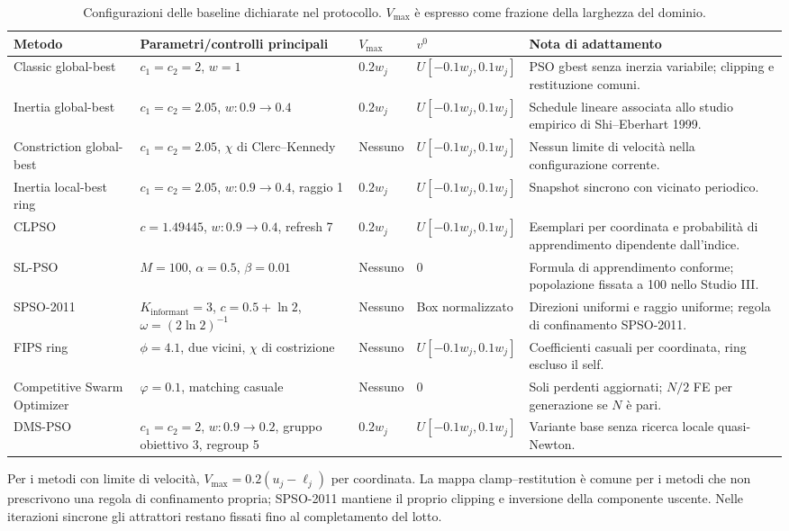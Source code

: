 \begin{table}[H]
\centering
\caption{Configurazioni delle baseline dichiarate nel protocollo. $V_{\max}$ è espresso come frazione della larghezza del dominio.}
\label{tab:app-baseline-config}
\small
\begin{tabularx}{\textwidth}{@{}lXllX@{}}
\toprule
Metodo & Parametri/controlli principali & $V_{\max}$ & $v^0$ & Nota di adattamento \\
\midrule
Classic global-best & $c_1=c_2=2$, $w=1$ & $0.2w_j$ & $U[-0.1w_j,0.1w_j]$ & PSO gbest senza inerzia variabile; clipping e restituzione comuni. \\
Inertia global-best & $c_1=c_2=2.05$, $w:0.9\to0.4$ & $0.2w_j$ & $U[-0.1w_j,0.1w_j]$ & Schedule lineare associata allo studio empirico di Shi--Eberhart 1999. \\
Constriction global-best & $c_1=c_2=2.05$, $\chi$ di Clerc--Kennedy & Nessuno & $U[-0.1w_j,0.1w_j]$ & Nessun limite di velocità nella configurazione corrente. \\
Inertia local-best ring & $c_1=c_2=2.05$, $w:0.9\to0.4$, raggio 1 & $0.2w_j$ & $U[-0.1w_j,0.1w_j]$ & Snapshot sincrono con vicinato periodico. \\
CLPSO & $c=1.49445$, $w:0.9\to0.4$, refresh 7 & $0.2w_j$ & $U[-0.1w_j,0.1w_j]$ & Esemplari per coordinata e probabilità di apprendimento dipendente dall'indice. \\
SL-PSO & $M=100$, $\alpha=0.5$, $\beta=0.01$ & Nessuno & $0$ & Formula di apprendimento conforme; popolazione fissata a 100 nello Studio III. \\
SPSO-2011 & $K_{\mathrm{informant}}=3$, $c=0.5+\ln2$, $\omega=(2\ln2)^{-1}$ & Nessuno & Box normalizzato & Direzioni uniformi e raggio uniforme; regola di confinamento SPSO-2011. \\
FIPS ring & $\phi=4.1$, due vicini, $\chi$ di costrizione & Nessuno & $U[-0.1w_j,0.1w_j]$ & Coefficienti casuali per coordinata, ring escluso il self. \\
Competitive Swarm Optimizer & $\varphi=0.1$, matching casuale & Nessuno & $0$ & Soli perdenti aggiornati; $N/2$ FE per generazione se $N$ è pari. \\
DMS-PSO & $c_1=c_2=2$, $w:0.9\to0.2$, gruppo obiettivo 3, regroup 5 & $0.2w_j$ & $U[-0.1w_j,0.1w_j]$ & Variante base senza ricerca locale quasi-Newton. \\
\bottomrule
\end{tabularx}
\end{table}

Per i metodi con limite di velocità, $V_{\max}=0.2(u_j-\ell_j)$ per coordinata. La mappa clamp--restitution è comune per i metodi che non prescrivono una regola di confinamento propria; SPSO-2011 mantiene il proprio clipping e inversione della componente uscente. Nelle iterazioni sincrone gli attrattori restano fissati fino al completamento del lotto.

